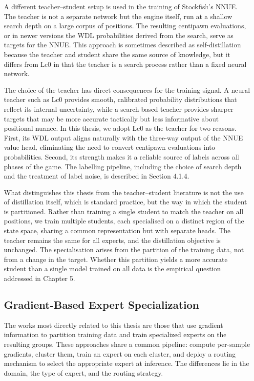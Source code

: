 A different teacher--student setup is used in the training of Stockfish's NNUE. The teacher is not a separate network but the engine itself, run at a shallow search depth on a large corpus of positions. The resulting centipawn evaluations, or in newer versions the WDL probabilities derived from the search, serve as targets for the NNUE. This approach is sometimes described as self-distillation because the teacher and student share the same source of knowledge, but it differs from Lc0 in that the teacher is a search process rather than a fixed neural network.

The choice of the teacher has direct consequences for the training signal. A neural teacher such as Lc0 provides smooth, calibrated probability distributions that reflect its internal uncertainty, while a search-based teacher provides sharper targets that may be more accurate tactically but less informative about positional nuance. In this thesis, we adopt Lc0 as the teacher for two reasons. First, its WDL output aligns naturally with the three-way output of the NNUE value head, eliminating the need to convert centipawn evaluations into probabilities. Second, its strength makes it a reliable source of labels across all phases of the game. The labelling pipeline, including the choice of search depth and the treatment of label noise, is described in Section 4.1.4.


What distinguishes this thesis from the teacher--student literature is not the use of distillation itself, which is standard practice, but the way in which the student is partitioned. Rather than training a single student to match the teacher on all positions, we train multiple students, each specialised on a distinct region of the state space, sharing a common representation but with separate heads. The teacher remains the same for all experts, and the distillation objective is unchanged. The specialisation arises from the partition of the training data, not from a change in the target. Whether this partition yields a more accurate student than a single model trained on all data is the empirical question addressed in Chapter 5.


\subsection{Gradient-Based Expert Specialization}

The works most directly related to this thesis are those that use gradient information to partition training data and train specialized experts on the resulting groups. These approaches share a common pipeline: compute per-sample gradients, cluster them, train an expert on each cluster, and deploy a routing mechanism to select the appropriate expert at inference. The differences lie in the domain, the type of expert, and the routing strategy.

